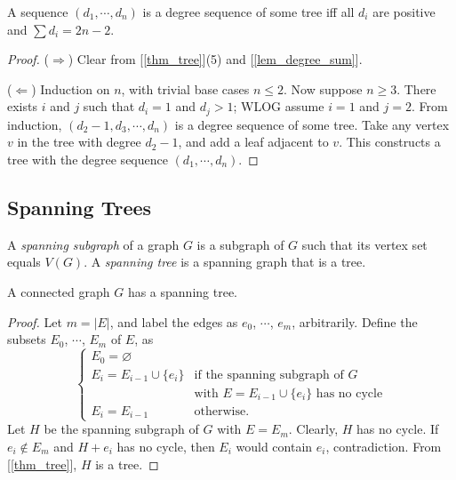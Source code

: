         \begin{thm} \label{thm_tree_degree}
            A sequence $(d_1,\cdots,d_n)$ is a degree sequence of some tree iff all $d_i$ are positive and $\sum d_i = 2n-2$.
        \end{thm}
        
        \begin{proof}
            ($\Rightarrow$) Clear from [\ref{thm_tree}](5) and [\ref{lem_degree_sum}].
            
            ($\Leftarrow$) Induction on $n$, with trivial base cases $n \leq 2$. Now suppose $n \geq 3$. There exists $i$ and $j$ such that $d_i=1$ and $d_j>1$; WLOG assume $i=1$ and $j=2$. From induction, $(d_2-1,d_3,\cdots,d_n)$ is a degree sequence of some tree. Take any vertex $v$ in the tree with degree $d_2-1$, and add a leaf adjacent to $v$. This constructs a tree with the degree sequence $(d_1,\cdots,d_n)$.
        \end{proof}
    
    \subsection{Spanning Trees}
        \begin{defn} \label{def_spanning}
            A \emph{spanning subgraph} of a graph $G$ is a subgraph of $G$ such that its vertex set equals $V(G)$. A \emph{spanning tree} is a spanning graph that is a tree.
        \end{defn}
        
        \begin{thm} \label{thm_spanning_tree}
            A connected graph $G$ has a spanning tree.
        \end{thm}
        
        \begin{proof}
            Let $m = |E|$, and label the edges as $e_0$, $\cdots$, $e_m$, arbitrarily. Define the subsets $E_0$, $\cdots$, $E_m$ of $E$, as \begin{displaymath} \begin{cases}
                E_0 = \varnothing \\
                E_i = E_{i-1} \cup \{e_i\} & \text{if the spanning subgraph of $G$} \\
                & \text{with $E = E_{i-1} \cup \{e_i\}$ has no cycle} \\
                E_i = E_{i-1} & \text{otherwise.}
            \end{cases} \end{displaymath}
            Let $H$ be the spanning subgraph of $G$ with $E = E_m$. Clearly, $H$ has no cycle. If $e_i \notin E_m$ and $H+e_i$ has no cycle, then $E_i$ would contain $e_i$, contradiction. From [\ref{thm_tree}], $H$ is a tree.
        \end{proof}
        
